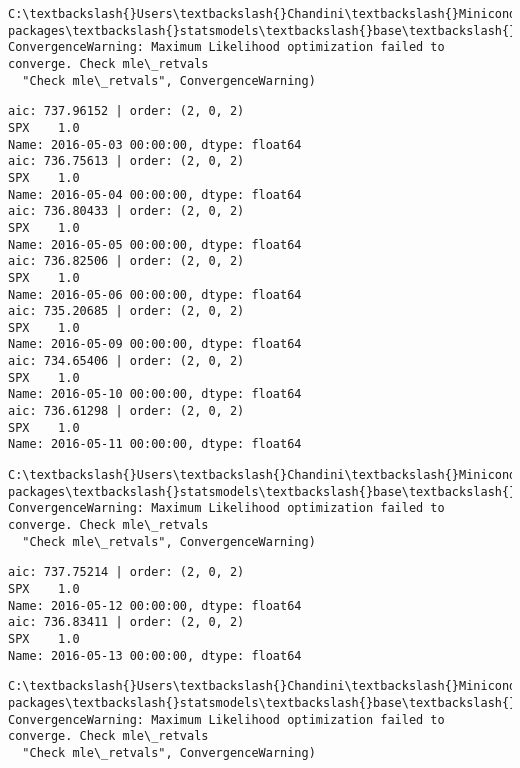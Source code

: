 \documentclass[11pt]{article}
\begin{document}
    \begin{Verbatim}[commandchars=\\\{\}]
C:\textbackslash{}Users\textbackslash{}Chandini\textbackslash{}Miniconda3\textbackslash{}envs\textbackslash{}auquan\textbackslash{}lib\textbackslash{}site-packages\textbackslash{}statsmodels\textbackslash{}base\textbackslash{}model.py:496: ConvergenceWarning: Maximum Likelihood optimization failed to converge. Check mle\_retvals
  "Check mle\_retvals", ConvergenceWarning)

    \end{Verbatim}

    \begin{Verbatim}[commandchars=\\\{\}]
aic: 737.96152 | order: (2, 0, 2)
SPX    1.0
Name: 2016-05-03 00:00:00, dtype: float64
aic: 736.75613 | order: (2, 0, 2)
SPX    1.0
Name: 2016-05-04 00:00:00, dtype: float64
aic: 736.80433 | order: (2, 0, 2)
SPX    1.0
Name: 2016-05-05 00:00:00, dtype: float64
aic: 736.82506 | order: (2, 0, 2)
SPX    1.0
Name: 2016-05-06 00:00:00, dtype: float64
aic: 735.20685 | order: (2, 0, 2)
SPX    1.0
Name: 2016-05-09 00:00:00, dtype: float64
aic: 734.65406 | order: (2, 0, 2)
SPX    1.0
Name: 2016-05-10 00:00:00, dtype: float64
aic: 736.61298 | order: (2, 0, 2)
SPX    1.0
Name: 2016-05-11 00:00:00, dtype: float64

    \end{Verbatim}

    \begin{Verbatim}[commandchars=\\\{\}]
C:\textbackslash{}Users\textbackslash{}Chandini\textbackslash{}Miniconda3\textbackslash{}envs\textbackslash{}auquan\textbackslash{}lib\textbackslash{}site-packages\textbackslash{}statsmodels\textbackslash{}base\textbackslash{}model.py:496: ConvergenceWarning: Maximum Likelihood optimization failed to converge. Check mle\_retvals
  "Check mle\_retvals", ConvergenceWarning)

    \end{Verbatim}

    \begin{Verbatim}[commandchars=\\\{\}]
aic: 737.75214 | order: (2, 0, 2)
SPX    1.0
Name: 2016-05-12 00:00:00, dtype: float64
aic: 736.83411 | order: (2, 0, 2)
SPX    1.0
Name: 2016-05-13 00:00:00, dtype: float64

    \end{Verbatim}

    \begin{Verbatim}[commandchars=\\\{\}]
C:\textbackslash{}Users\textbackslash{}Chandini\textbackslash{}Miniconda3\textbackslash{}envs\textbackslash{}auquan\textbackslash{}lib\textbackslash{}site-packages\textbackslash{}statsmodels\textbackslash{}base\textbackslash{}model.py:496: ConvergenceWarning: Maximum Likelihood optimization failed to converge. Check mle\_retvals
  "Check mle\_retvals", ConvergenceWarning)

    \end{Verbatim}
\end{document}
